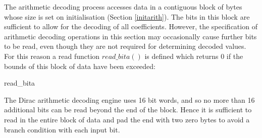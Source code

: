 \label{inputarith}

The arithmetic decoding process accesses data in a contiguous block of bytes
whose size is set on initialisation (Section \ref{initarith}). The bits in this
block are sufficient to allow for the
decoding of all coefficients. However, the specification of arithmetic
decoding operations in this section may occasionally cause further bits to be read,
even though they are not required for determining decoded values. For this
reason a read function $read\_bita()$ is defined which returns $0$ if the
bounds of this block of data have been exceeded:

\begin{pseudo}{read\_bita}{}
\bsELSE
\bsEND
\end{pseudo}

\begin{informative}
The Dirac arithmetic decoding engine uses 16 bit words, and so no more than 16
additional bits can be read beyond the end of the block. Hence it is sufficient
to read in the entire block of data and pad the end with two zero bytes to
avoid a branch condition with each input bit.
\end{informative}
